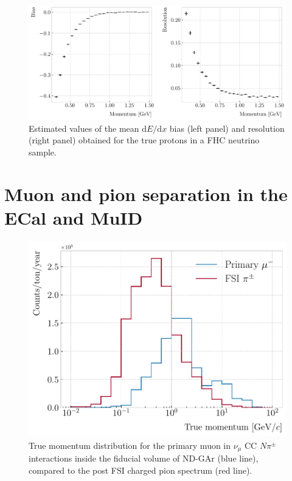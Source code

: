 \begin{figure}[t]
	\centering
	\includegraphics[width=.90\linewidth]{Images/GArSoft_PID/dEdx/proton_dEdx_momentum.pdf}
	\caption[Estimated values of the mean $\mathrm{d}E/\mathrm{d}x$ bias and resolution obtained for the true protons in a FHC neutrino sample.]{Estimated values of the mean $\mathrm{d}E/\mathrm{d}x$ bias (left panel) and resolution (right panel) obtained for the true protons in a FHC neutrino sample.}
	\label{fig:proton_dEdx_momentum}
\end{figure}

\section{Muon and pion separation in the ECal and MuID}

\begin{figure}[t]
	\centering
	\includegraphics[width=.70\linewidth]{Images/GArSoft_PID/BDT/ndgar_fhc_numu_cc_mu_spectrum.pdf}
	\caption[True momentum distribution for the primary muon in $\nu_{\mu}$ CC $N\pi^{\pm}$ interactions inside the fiducial volume of ND-GAr, compared to the post FSI charged pion spectrum.]{True momentum distribution for the primary muon in $\nu_{\mu}$ CC $N\pi^{\pm}$ interactions inside the fiducial volume of ND-GAr (blue line), compared to the post FSI charged pion spectrum (red line).}
	\label{fig:primary_muon_spectrum}
\end{figure}

